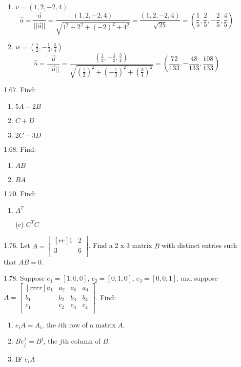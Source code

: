 \documentclass[12pt]{article}
\begin{document}
\begin{enumerate}
\begin{enumerate}
	\item $v=(1,2,-2,4)$\\
		\[ \hat{u} = \frac{\vec{u}}{||\vec{u}||} = \frac{(1,2,-2,4)}{\sqrt{1^2 + 2^2 + (-2)^2 + 4^2}} = \frac{(1,2,-2,4)}{\sqrt{25}} = (\frac{1}{5},\frac{2}{5},-\frac{2}{5},\frac{4}{5}) \]
		
	\item $w=(\frac{1}{2},-\frac{1}{3},\frac{3}{4})$\\
		\[ \hat{u} = \frac{\vec{u}}{||\vec{u}||} = \frac{(\frac{1}{2},-\frac{1}{3},\frac{3}{4})}{\sqrt{(\frac{1}{2})^2 + (-\frac{1}{3})^2 + (\frac{3}{4})^2}} =  (\frac{72}{133},-\frac{48}{133},\frac{108}{133}) \]
	\end{enumerate}
\item[1.67.] Find:
	\begin{enumerate}
	\item $5A-2B$
	\item $C+D$
	\item $2C-3D$
	\end{enumerate}
\item[1.68.] Find:
	\begin{enumerate}
	\item $AB$
	\item $BA$
	\end{enumerate}
\item[1.70.] Find:
	\begin{enumerate}
	\item $A^T$
	
	\item[(c)] $C^T C$
	\end{enumerate}
\item[1.76.] Let $A=\begin{bmatrix}[rr] 1 & 2\\ 3 & 6\\ \end{bmatrix}$.
	Find a 2 x 3 matrix $B$ with distinct entries such that $AB = 0$.
\item[1.78.] Suppose $e_1=[1,0,0]$, $e_2=[0,1,0]$, $e_3=[0,0,1]$, and suppose $A=
\begin{bmatrix}[rrrr]
a_1 & a_2 & a_3 & a_4\\
b_1 & b_2 & b_3 & b_4\\
c_1 & c_2 & c_3 & c_4\\
\end{bmatrix}$. Find:
	\begin{enumerate}
	\item $e_iA=A_i$, the $i$th row of a matrix $A$.
	\item $Be_j^T=B^j$, the $j$th column of $B$.
	\item IF $e_iA$
	\end{enumerate}
\end{enumerate}
\end{document}
